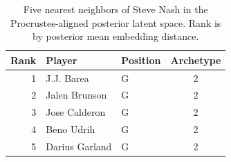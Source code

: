 \begin{table}[htbp]
  \centering\small
  \begin{tabular}{rllc}
    \toprule
    Rank & Player & Position & Archetype \\
    \midrule
    1 & J.J. Barea & G & 2 \\
    2 & Jalen Brunson & G & 2 \\
    3 & Jose Calderon & G & 2 \\
    4 & Beno Udrih & G & 2 \\
    5 & Darius Garland & G & 2 \\
    \bottomrule
  \end{tabular}
  \caption{Five nearest neighbors of Steve Nash in the Procrustes-aligned posterior latent space. Rank is by posterior mean embedding distance.}
  \label{tab:Steve_Nash_neighbors}
\end{table}

